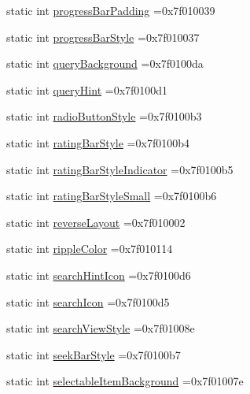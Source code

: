 \begin{DoxyCompactItemize}
static int \hyperlink{classandroid_1_1support_1_1design_1_1R_1_1attr_a0ae78413275468b2c80b4a5ec679467c}{progress\+Bar\+Padding} =0x7f010039
\item 
static int \hyperlink{classandroid_1_1support_1_1design_1_1R_1_1attr_a6cda284efed118d0df86a70fe310133d}{progress\+Bar\+Style} =0x7f010037
\item 
static int \hyperlink{classandroid_1_1support_1_1design_1_1R_1_1attr_aac7f3cc9efb220e9fa9bfe562916b922}{query\+Background} =0x7f0100da
\item 
static int \hyperlink{classandroid_1_1support_1_1design_1_1R_1_1attr_a7c779885d4f7e8381f2dbfbd244c5470}{query\+Hint} =0x7f0100d1
\item 
static int \hyperlink{classandroid_1_1support_1_1design_1_1R_1_1attr_ac48d1073bda75cb7de2a7a4c3561389e}{radio\+Button\+Style} =0x7f0100b3
\item 
static int \hyperlink{classandroid_1_1support_1_1design_1_1R_1_1attr_a0c99b738ca23e4fd5b38f04d0b494a99}{rating\+Bar\+Style} =0x7f0100b4
\item 
static int \hyperlink{classandroid_1_1support_1_1design_1_1R_1_1attr_a3aa9f493418e2936285f232cc189efa5}{rating\+Bar\+Style\+Indicator} =0x7f0100b5
\item 
static int \hyperlink{classandroid_1_1support_1_1design_1_1R_1_1attr_a5d864933e2126f8bb0abceec75b67646}{rating\+Bar\+Style\+Small} =0x7f0100b6
\item 
static int \hyperlink{classandroid_1_1support_1_1design_1_1R_1_1attr_a2a3ab85c24fa59afc341f28995a2ad4e}{reverse\+Layout} =0x7f010002
\item 
static int \hyperlink{classandroid_1_1support_1_1design_1_1R_1_1attr_a03164f9c470ccf03a4ce67c539f71698}{ripple\+Color} =0x7f010114
\item 
static int \hyperlink{classandroid_1_1support_1_1design_1_1R_1_1attr_a5db56ee02e5f7a0494a2e099b6d10644}{search\+Hint\+Icon} =0x7f0100d6
\item 
static int \hyperlink{classandroid_1_1support_1_1design_1_1R_1_1attr_a086a4c10a5ff7204fc9c9035a77d0c50}{search\+Icon} =0x7f0100d5
\item 
static int \hyperlink{classandroid_1_1support_1_1design_1_1R_1_1attr_a7563597120eec32553578260707cea59}{search\+View\+Style} =0x7f01008e
\item 
static int \hyperlink{classandroid_1_1support_1_1design_1_1R_1_1attr_a1111429614a393a0cb64b39d2410a472}{seek\+Bar\+Style} =0x7f0100b7
\item 
static int \hyperlink{classandroid_1_1support_1_1design_1_1R_1_1attr_aa055c8d97d831aa8514926ba6216696f}{selectable\+Item\+Background} =0x7f01007e

\end{DoxyCompactItemize}
